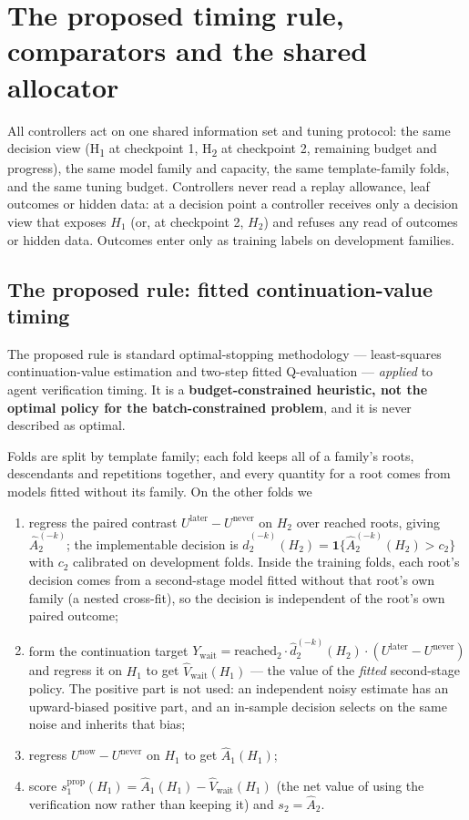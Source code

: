 \section{The proposed timing rule, comparators and the shared allocator}
\label{sec:policy}

All controllers act on one shared information set and tuning protocol: the same
decision view (H\textsubscript{1} at checkpoint 1, H\textsubscript{2} at
checkpoint 2, remaining budget and progress), the same model family and capacity,
the same template-family folds, and the same tuning budget.  Controllers never
read a replay allowance, leaf outcomes or hidden data: at a decision point a
controller receives only a decision view that exposes $H_1$ (or, at checkpoint 2,
$H_2$) and refuses any read of outcomes or hidden data.  Outcomes enter only as
training labels on development families.

\subsection{The proposed rule: fitted continuation-value timing}
\label{sec:b-proposed}

The proposed rule is standard optimal-stopping methodology --- least-squares
continuation-value estimation \citep{longstaffschwartz2001} and two-step fitted
Q-evaluation \citep{ernst2005} --- \emph{applied} to agent verification timing.
It is a \textbf{budget-constrained heuristic, not the optimal policy for the
batch-constrained problem}, and it is never described as optimal.

Folds are split by template family; each fold keeps all of a family's roots,
descendants and repetitions together, and every quantity for a root comes from
models fitted without its family.  On the other folds we
\begin{enumerate}[label=(\arabic*),leftmargin=2em]
\item regress the paired contrast $U^{\text{later}}-U^{\text{never}}$ on
  $H_2$ over reached roots, giving $\hat A_2^{(-k)}$; the implementable
  decision is $\hat d_2^{(-k)}(H_2)=\mathbf 1\{\hat A_2^{(-k)}(H_2)>c_2\}$ with
  $c_2$ calibrated on development folds.  Inside the training folds, each root's
  decision comes from a second-stage model fitted without that root's own
  family (a nested cross-fit), so the decision is independent of the root's own
  paired outcome;
\item form the continuation target $Y_{\text{wait}} =
  \text{reached}_2\cdot \hat d_2^{(-k)}(H_2)\cdot(U^{\text{later}}-U^{\text{never}})$
  and regress it on $H_1$ to get $\hat V_{\text{wait}}(H_1)$ --- the value of the
  \emph{fitted} second-stage policy.  The positive part is not used: an
  independent noisy estimate has an upward-biased positive part, and an
  in-sample decision selects on the same noise and inherits that bias;
\item regress $U^{\text{now}}-U^{\text{never}}$ on $H_1$ to get $\hat A_1(H_1)$;
\item score $s_1^{\text{prop}}(H_1)=\hat A_1(H_1)-\hat V_{\text{wait}}(H_1)$ (the
  net value of using the verification now rather than keeping it) and
  $s_2=\hat A_2$.
\end{enumerate}

